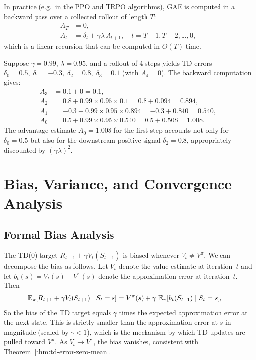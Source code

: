 In practice (e.g.\ in the PPO and TRPO algorithms), GAE is computed in a backward pass over a collected rollout of length $T$:
\begin{align*}
A_T &= 0,\\
A_t &= \delta_t + \gamma\lambda\,A_{t+1}, \quad t = T-1, T-2, \ldots, 0,
\end{align*}
which is a linear recursion that can be computed in $O(T)$ time.

\begin{example}
Suppose $\gamma=0.99$, $\lambda=0.95$, and a rollout of 4 steps yields TD errors $\delta_0=0.5,\;\delta_1=-0.3,\;\delta_2=0.8,\;\delta_3=0.1$ (with $A_4=0$).  The backward computation gives:
\begin{align*}
A_3 &= 0.1 + 0 = 0.1,\\
A_2 &= 0.8 + 0.99\times 0.95\times 0.1 = 0.8 + 0.094 = 0.894,\\
A_1 &= -0.3 + 0.99\times 0.95\times 0.894 = -0.3 + 0.840 = 0.540,\\
A_0 &= 0.5 + 0.99\times 0.95\times 0.540 = 0.5 + 0.508 = 1.008.
\end{align*}
The advantage estimate $A_0 = 1.008$ for the first step accounts not only for $\delta_0 = 0.5$ but also for the downstream positive signal $\delta_2 = 0.8$, appropriately discounted by $(\gamma\lambda)^2$.
\end{example}

\section{Bias, Variance, and Convergence Analysis}
\label{sec:td-bias-variance}

\subsection{Formal Bias Analysis}

The TD(0) target $R_{t+1}+\gamma V_t(S_{t+1})$ is biased whenever $V_t \ne V^\pi$.  We can decompose the bias as follows.  Let $V_t$ denote the value estimate at iteration~$t$ and let $b_t(s) = V_t(s) - V^\pi(s)$ denote the approximation error at iteration~$t$.  Then
\begin{align*}
\operatorname{\mathbb{E}}_\pi[R_{t+1}+\gamma V_t(S_{t+1})\mid S_t=s]
&= V^\pi(s) + \gamma\,\operatorname{\mathbb{E}}_\pi[b_t(S_{t+1})\mid S_t=s],
\end{align*}
So the bias of the TD target equals $\gamma$ times the expected approximation error at the next state.  This is strictly smaller than the approximation error at $s$ in magnitude (scaled by $\gamma < 1$), which is the mechanism by which TD updates are pulled toward $V^\pi$.  As $V_t\to V^\pi$, the bias vanishes, consistent with Theorem~\ref{thm:td-error-zero-mean}.

